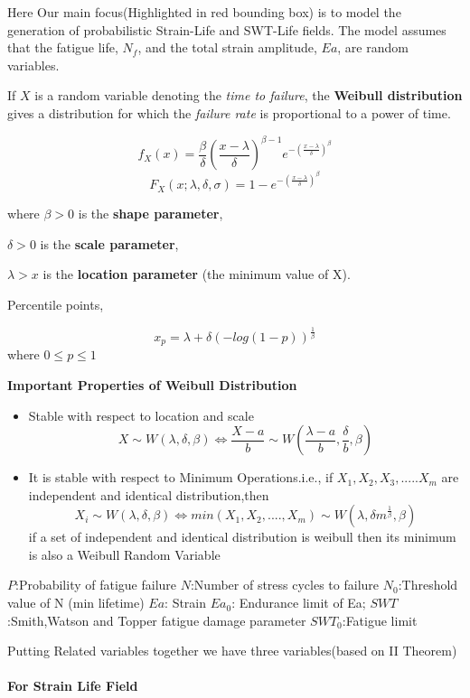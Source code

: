 \documentclass[11pt]{article}
\begin{document}
Here Our main focus(Highlighted in red bounding box) is to model the
generation of probabilistic Strain-Life and SWT-Life fields. The model
assumes that the fatigue life, \(N_f\), and the total strain amplitude,
\(Ea\), are random variables.

If \(X\) is a random variable denoting the \emph{time to failure}, the
\textbf{Weibull distribution} gives a distribution for which the
\emph{failure rate} is proportional to a power of time.

\[
f_X(x) = 
\frac{\beta}{\delta}(\frac{x-\lambda}{\delta})^{\beta-1}e^{-(\frac{x-\lambda}{\delta})^\beta}
\] \[
F_X(x;\lambda,\delta,\sigma) = 1-e^{-({\frac{x-\lambda}{\delta}})^\beta}
\]

where \(\beta > 0\) is the \textbf{shape parameter},

\(\delta > 0\) is the \textbf{scale parameter},

\(\lambda > x\) is the \textbf{location parameter} (the minimum value of
X).

Percentile points,

\[
x_p = \lambda + \delta(-log(1-p))^{\frac{1}{\beta}}
\] where \(0\leq p\leq 1\)

\textbf{Important Properties of Weibull Distribution}

\begin{itemize}
\item
  Stable with respect to location and scale \[
  X \sim W(\lambda,\delta,\beta) \iff \frac{X-a}{b} \sim W(\frac{\lambda-a}{b},\frac{\delta}{b},\beta)
  \]
\item
  It is stable with respect to Minimum Operations.i.e., if
  \(X_1,X_2,X_3,.....X_m\) are independent and identical
  distribution,then \[
  X_i\sim W(\lambda,\delta,\beta) \iff min(X_1,X_2,....,X_m) \sim W(\lambda,\delta m^{\frac{1}{\beta}},\beta)
  \] if a set of independent and identical distribution is weibull then
  its minimum is also a Weibull Random Variable
\end{itemize}

\(P\):Probability of fatigue failure \(N\):Number of stress cycles to
failure \(N_0\):Threshold value of N (min lifetime) \(Ea\): Strain
\(Ea_0\): Endurance limit of Ea; \(SWT\):Smith,Watson and Topper fatigue
damage parameter \(SWT_0\):Fatigue limit

Putting Related variables together we have three variables(based on II
Theorem)

\hypertarget{for-strain-life-field}{%
\paragraph{For Strain Life Field}\label{for-strain-life-field}}
\end{document}
